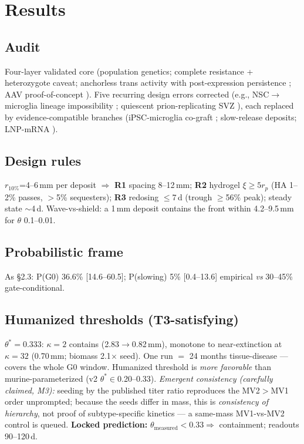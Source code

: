 \documentclass[10pt,twocolumn]{article}
\begin{document}
\section{Results}
\subsection{Audit}
Four-layer validated core (population genetics; complete resistance + heterozygote caveat; anchorless trans activity with post-expression persistence \citep{gatdula2026}; AAV proof-of-concept \citep{zerbes2026}). Five recurring design errors corrected (e.g., NSC$\to$microglia lineage impossibility \citep{ginhoux2010}; quiescent prion-replicating SVZ \citep{sorrells2018,relano2013}), each replaced by evidence-compatible branches (iPSC-microglia co-graft \citep{abud2017}; slow-release deposits; LNP-mRNA \citep{xue2025}).

\subsection{Design rules} $r_{10\%}$=4--6\,mm per deposit $\Rightarrow$ \textbf{R1} spacing 8--12\,mm; \textbf{R2} hydrogel $\xi\ge5r_p$ (HA 1--2\% passes, $>$5\% sequesters); \textbf{R3} redosing $\le$7\,d (trough $\ge$56\% peak); steady state $\sim$4\,d. Wave-vs-shield: a 1\,mm deposit contains the front within 4.2--9.5\,mm for $\theta$ 0.1--0.01.

\subsection{Probabilistic frame} As §2.3: P(G0) 36.6\% [14.6--60.5]; P(slowing) 5\% [0.4--13.6] empirical \emph{vs} 30--45\% gate-conditional.

\subsection{Humanized thresholds (T3-satisfying)} $\theta^{*}=0.333$: $\kappa{=}2$ contains (2.83$\to$0.82\,mm), monotone to near-extinction at $\kappa{=}32$ (0.70\,mm; biomass 2.1$\times$ seed). One run $=$ 24 months tissue-disease --- covers the whole G0 window. Humanized threshold is \emph{more favorable} than murine-parameterized (v2 $\theta^*\in$0.20--0.33). \emph{Emergent consistency (carefully claimed, M3):} seeding by the published titer ratio reproduces the MV2$>$MV1 order unprompted; because the seeds differ in mass, this is \emph{consistency of hierarchy}, not proof of subtype-specific kinetics --- a same-mass MV1-vs-MV2 control is queued. \textbf{Locked prediction:} $\theta_{\text{measured}}<0.33\Rightarrow$ containment; readouts 90--120\,d.
\end{document}
